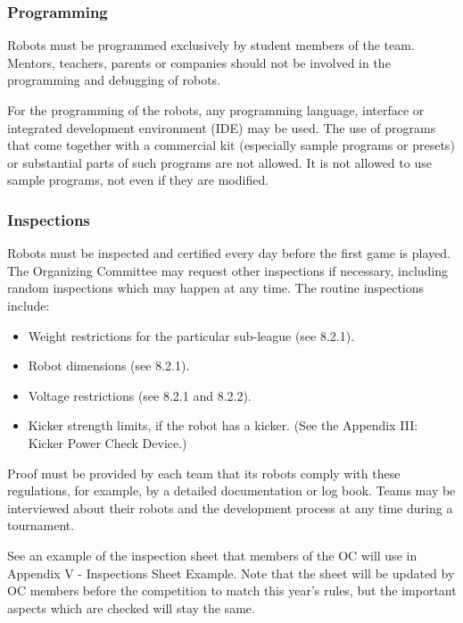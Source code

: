 \documentclass{article}
\begin{document}
\subsubsection{Programming \label{ref-058}}

Robots must be programmed exclusively by student members of the team. Mentors,
teachers, parents or companies should not be involved in the programming and
debugging of robots.

For the programming of the robots, any programming language, interface or
integrated development environment (IDE) may be used. The use of programs that
come together with a commercial kit (especially sample programs or presets) or
substantial parts of such programs are not allowed. It is not allowed to use
sample programs, not even if they are modified.

\subsubsection{Inspections \label{ref-059}}

Robots must be inspected and certified every day before the first game is
played. The Organizing Committee may request other inspections if necessary,
including random inspections which may happen at any time. The routine
inspections include:

\begin{itemize}
\item Weight restrictions for the particular sub-league (see 8.2.1).

\item Robot dimensions (see 8.2.1).

\item Voltage restrictions (see 8.2.1 and 8.2.2).

\item Kicker strength limits, if the robot has a kicker. (See the Appendix III: Kicker Power Check Device.)
\end{itemize}

Proof must be provided by each team that its robots comply with these
regulations, for example, by a detailed documentation or log book. Teams may be
interviewed about their robots and the development process at any time during a
tournament.

See an example of the inspection sheet that members of the OC will use in
Appendix V - Inspections Sheet Example. Note that the sheet will be updated by
OC members before the competition to match this year's rules, but the important
aspects which are checked will stay the same.
\end{document}
